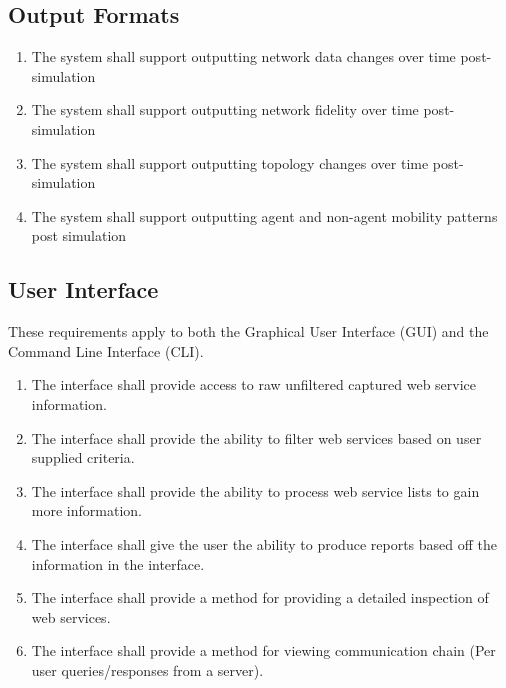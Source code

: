 \documentclass[titlepage]{article}
\begin{document}

\subsection{Output Formats%
  \label{output-formats}%
}

\begin{enumerate}
    \item The system shall support outputting network data changes over time post-simulation
		\item The system shall support outputting network fidelity over time post-simulation
		\item The system shall support outputting topology changes over time post-simulation
		\item The system shall support outputting agent and non-agent mobility patterns post simulation
\end{enumerate}


\subsection{User Interface%
  \label{user-interface}%
}

These requirements apply to both the Graphical User Interface (GUI) and the
Command Line Interface (CLI).

\begin{enumerate}
    \item The interface shall provide access to raw unfiltered captured
        web service information.
    \item The interface shall provide the ability to filter web
        services based on user supplied criteria.
    \item The interface shall provide the ability to process web
        service lists to gain more information.
    \item The interface shall give the user the ability to produce
        reports based off the information in the interface.
    \item The interface shall provide a method for providing a
        detailed inspection of web services.
    \item The interface shall provide a method for viewing
        communication chain (Per user queries/responses from a server).
\end{enumerate}
\end{document}
